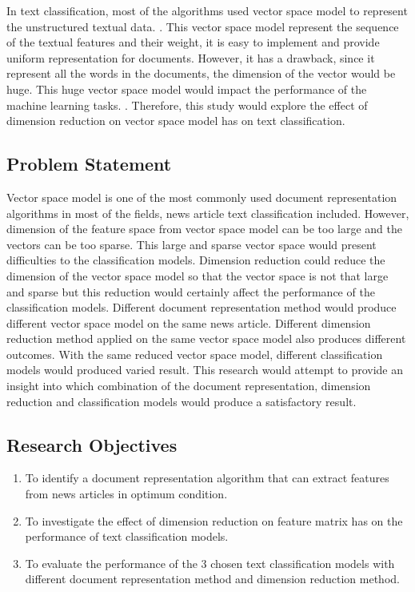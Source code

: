 In text classification, most of the algorithms used vector space model to represent the unstructured textual data. \cite{vectorSpaceModelText}. This vector space model represent the sequence of the textual features and their weight, it is easy to implement and provide uniform representation for documents. However, it has a drawback, since it represent all the words in the documents, the dimension of the vector would be huge. This huge vector space model would impact the performance of the machine learning tasks. \cite{knnVectorSpaceReduction}. Therefore, this study would explore the effect of dimension reduction on vector space model has on text classification.\\

\subsection{Problem Statement}
Vector space model is one of the most commonly used document representation algorithms in most of the fields, news article text classification included. However, dimension of the feature space from vector space model can be too large and the vectors can be too sparse. This large and sparse vector space would present difficulties to the classification models. Dimension reduction could reduce the dimension of the vector space model so that the vector space is not that large and sparse but this reduction would certainly affect the performance of the classification models. Different document representation method would produce different vector space model on the same news article. Different dimension reduction method applied on the same vector space model also produces different outcomes. With the same reduced vector space model, different classification models would produced varied result. This research would attempt to provide an insight into which combination of the document representation, dimension reduction and classification models would produce a satisfactory result.\\

\subsection{Research Objectives}
\begin{enumerate}
	\item To identify a document representation algorithm that can extract features from news articles in optimum condition.
	\item To investigate the effect of dimension reduction on feature matrix has on the performance of text classification models.
	\item To evaluate the performance of the 3 chosen text classification models with different document representation method and dimension reduction method.
\end{enumerate}


